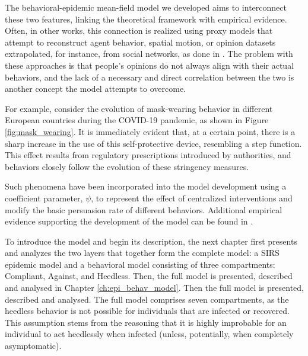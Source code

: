 The behavioral-epidemic mean-field model we developed aims to interconnect these two features, linking the theoretical framework with empirical evidence. Often, in other works, this connection is realized using proxy models that attempt to reconstruct agent behavior, spatial motion, or opinion datasets extrapolated, for instance, from social networks, as done in \cite{Anderson_2019,Zino_2021}. The problem with these approaches is that people's opinions do not always align with their actual behaviors, and the lack of a necessary and direct correlation between the two is another concept the model attempts to overcome.

For example, consider the evolution of mask-wearing behavior in different European countries during the COVID-19 pandemic, as shown in Figure \ref{fig:mask_wearing}. It is immediately evident that, at a certain point, there is a sharp increase in the use of this self-protective device, resembling a step function. This effect results from regulatory prescriptions introduced by authorities, and behaviors closely follow the evolution of these stringency measures.

Such phenomena have been incorporated into the model development using a coefficient parameter, $\psi$, to represent the effect of centralized interventions and modify the basic persuasion rate of different behaviors. Additional empirical evidence supporting the development of the model can be found in \cite{Proverbio_Tex_2024}. 


To introduce the model and begin its description, the next chapter first presents and analyzes the two layers that together form the complete model: a SIRS epidemic model and a behavioral model consisting of three compartments: Compliant, Against, and Heedless. Then, the full model is presented, described and analysed in Chapter \ref{ch:epi_behav_model}.
Then the full model is presented, described and analysed. 
The full model comprises seven compartments, as the heedless behavior is not possible for individuals that are infected or recovered. This assumption stems from the reasoning that it is highly improbable for an individual to act heedlessly when infected (unless, potentially, when completely asymptomatic).

